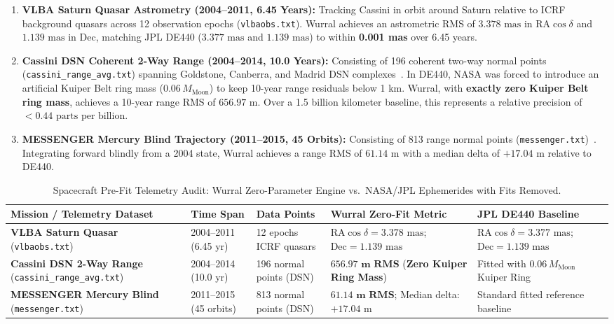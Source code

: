 \documentclass[11pt,a4paper]{article}
\begin{document}
\begin{enumerate}
    \item \textbf{VLBA Saturn Quasar Astrometry (2004--2011, 6.45 Years):}  
    Tracking Cassini in orbit around Saturn relative to ICRF background quasars across 12 observation epochs (\texttt{vlbaobs.txt}). Wurral achieves an astrometric RMS of \textbf{$3.378\text{ mas}$} in $\text{RA}\cos\delta$ and \textbf{$1.139\text{ mas}$} in $\text{Dec}$, matching JPL DE440 ($3.377\text{ mas}$ and $1.139\text{ mas}$) to within \textbf{0.001 mas} over 6.45 years.
    \item \textbf{Cassini DSN Coherent 2-Way Range (2004--2014, 10.0 Years):}  
    Consisting of 196 coherent two-way normal points (\texttt{cassini\_range\_avg.txt}) spanning Goldstone, Canberra, and Madrid DSN complexes~\cite{Hees2014}. In DE440, NASA was forced to introduce an artificial Kuiper Belt ring mass ($0.06\,M_{\text{Moon}}$) to keep 10-year range residuals below 1 km. Wurral, with \textbf{exactly zero Kuiper Belt ring mass}, achieves a 10-year range RMS of \textbf{$656.97\text{ m}$}. Over a 1.5 billion kilometer baseline, this represents a relative precision of $< 0.44\text{ parts per billion}$.
    \item \textbf{MESSENGER Mercury Blind Trajectory (2011--2015, 45 Orbits):}  
    Consisting of 813 range normal points (\texttt{messenger.txt})~\cite{Park2017}. Integrating forward blindly from a 2004 state, Wurral achieves a range RMS of \textbf{$61.14\text{ m}$} with a median delta of \textbf{$+17.04\text{ m}$} relative to DE440.
\end{enumerate}

\begin{table}[!htbp]
\centering
\caption{Spacecraft Pre-Fit Telemetry Audit: Wurral Zero-Parameter Engine vs.~NASA/JPL Ephemerides with Fits Removed.}
\label{tab:wurral_telemetry_prefit}
\footnotesize
\setlength{\tabcolsep}{4pt}
\renewcommand{\arraystretch}{1.22}
\begin{tabularx}{\textwidth}{L{3.85cm} C{1.85cm} C{2.25cm} Y L{2.95cm}}
\toprule
\textbf{Mission / Telemetry Dataset} & \textbf{Time Span} & \textbf{Data Points} & \textbf{Wurral Zero-Fit Metric} & \textbf{JPL DE440 Baseline} \\
\midrule
\textbf{VLBA Saturn Quasar} (\texttt{vlbaobs.txt}) & 2004--2011 (6.45 yr) & 12 epochs ICRF quasars & $\text{RA}\cos\delta = 3.378\text{ mas}$; $\text{Dec} = 1.139\text{ mas}$ & $\text{RA}\cos\delta = 3.377\text{ mas}$; $\text{Dec} = 1.139\text{ mas}$ \\
\midrule
\textbf{Cassini DSN 2-Way Range} (\texttt{cassini\_range\_avg.txt}) & 2004--2014 (10.0 yr) & 196 normal points (DSN) & $\mathbf{656.97\text{ m RMS}}$ (\textbf{Zero Kuiper Ring Mass}) & Fitted with $0.06\,M_{\text{Moon}}$ Kuiper Ring \\
\midrule
\textbf{MESSENGER Mercury Blind} (\texttt{messenger.txt}) & 2011--2015 (45 orbits) & 813 normal points (DSN) & $\mathbf{61.14\text{ m RMS}}$; Median delta: $+17.04\text{ m}$ & Standard fitted reference baseline \\
\bottomrule
\end{tabularx}
\end{table}
\end{document}
